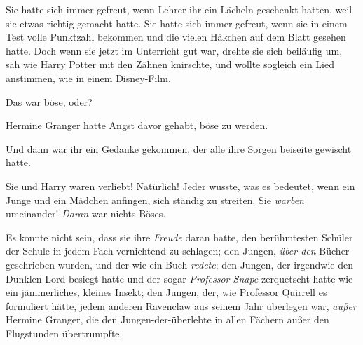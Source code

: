 Sie hatte sich immer gefreut, wenn Lehrer ihr ein Lächeln geschenkt hatten, weil sie etwas richtig gemacht hatte. Sie hatte sich immer gefreut, wenn sie in einem Test volle Punktzahl bekommen und die vielen Häkchen auf dem Blatt gesehen hatte. Doch wenn sie jetzt im Unterricht gut war, drehte sie sich beiläufig um, sah wie Harry Potter mit den Zähnen knirschte, und wollte sogleich ein Lied anstimmen, wie in einem Disney-Film.

Das war böse, oder?

Hermine Granger hatte Angst davor gehabt, böse zu werden.

Und dann war ihr ein Gedanke gekommen, der alle ihre Sorgen beiseite gewischt hatte.

Sie und Harry waren verliebt! Natürlich! Jeder wusste, was es bedeutet, wenn ein Junge und ein Mädchen anfingen, sich ständig zu streiten. Sie \emph{warben} umeinander! \emph{Daran} war nichts Böses.

Es konnte nicht sein, dass sie ihre \emph{Freude} daran hatte, den berühmtesten Schüler der Schule in jedem Fach vernichtend zu schlagen; den Jungen, \emph{über den} Bücher geschrieben wurden, und der wie ein Buch \emph{redete}; den Jungen, der irgendwie den Dunklen Lord besiegt hatte und der sogar \emph{Professor Snape} zerquetscht hatte wie ein jämmerliches, kleines Insekt; den Jungen, der, wie Professor Quirrell es formuliert hätte, jedem anderen Ravenclaw aus seinem Jahr überlegen war, \emph{außer} Hermine Granger, die den Jungen-der-überlebte in allen Fächern außer den Flugstunden übertrumpfte.

